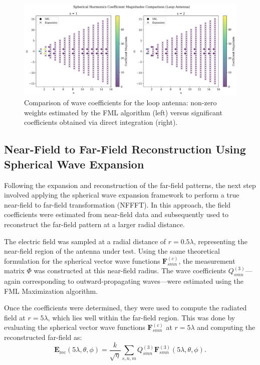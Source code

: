 \documentclass{article}
\begin{document}
\begin{figure}[H]
    \centering
    \includegraphics[width=1\linewidth]{Figures/loop_ff_weights.png}
    \caption{Comparison of wave coefficients for the loop antenna: non-zero weights estimated by the FML algorithm (left) versus significant coefficients obtained via direct integration (right).}
    \label{fig:loop_weights}
\end{figure}


\subsection{Near-Field to Far-Field Reconstruction Using Spherical Wave Expansion}

Following the expansion and reconstruction of the far-field patterns, the next step involved applying the spherical wave expansion framework to perform a true near-field to far-field transformation (NFFFT). In this approach, the field coefficients were estimated from near-field data and subsequently used to reconstruct the far-field pattern at a larger radial distance.

The electric field was sampled at a radial distance of $r = 0.5\lambda$, representing the near-field region of the antenna under test. Using the same theoretical formulation for the spherical vector wave functions $\mathbf{F}_{smn}^{(c)}$, the measurement matrix $\Phi$ was constructed at this near-field radius. The wave coefficients $Q_{smn}^{(3)}$—again corresponding to outward-propagating waves—were estimated using the FML Maximization algorithm.

Once the coefficients were determined, they were used to compute the radiated field at $r = 5\lambda$, which lies well within the far-field region. This was done by evaluating the spherical vector wave functions $\mathbf{F}_{smn}^{(c)}$ at $r = 5\lambda$ and computing the reconstructed far-field as:
\[
\mathbf{E}_{\text{rec}}(5\lambda, \theta, \phi) = \frac{k}{\sqrt{\eta}} \sum_{s,n,m} Q_{smn}^{(3)} \mathbf{F}_{smn}^{(3)}(5\lambda, \theta, \phi).
\]
\end{document}
